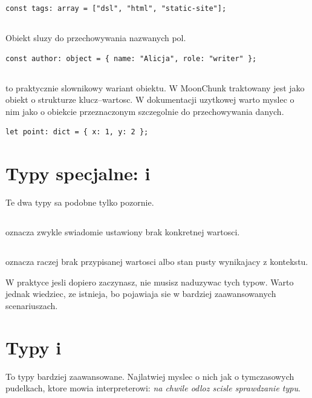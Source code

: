 \begin{lstlisting}[style=moonchunk,caption={Tablica}]
const tags: array = ["dsl", "html", "static-site"];
\end{lstlisting}

\subsection*{}
Obiekt sluzy do przechowywania nazwanych pol.

\begin{lstlisting}[style=moonchunk,caption={Obiekt}]
const author: object = { name: "Alicja", role: "writer" };
\end{lstlisting}

\subsection*{}
 to praktycznie slownikowy wariant obiektu. W MoonChunk traktowany jest jako
obiekt o strukturze klucz--wartosc. W dokumentacji uzytkowej warto myslec o nim jako o
obiekcie przeznaczonym szczegolnie do przechowywania danych.

\begin{lstlisting}[style=moonchunk,caption={Slownik typu dict}]
let point: dict = { x: 1, y: 2 };
\end{lstlisting}

\section{Typy specjalne:  i }
Te dwa typy sa podobne tylko pozornie.

\subsection*{}
 oznacza zwykle swiadomie ustawiony brak konkretnej wartosci.

\subsection*{}
 oznacza raczej brak przypisanej wartosci albo stan pusty wynikajacy
z kontekstu.

W praktyce jesli dopiero zaczynasz, nie musisz naduzywac tych typow. Warto jednak
wiedziec, ze istnieja, bo pojawiaja sie w bardziej zaawansowanych scenariuszach.

\section{Typy  i }
To typy bardziej zaawansowane. Najlatwiej myslec o nich jak o tymczasowych pudelkach,
ktore mowia interpreterowi: \emph{na chwile odloz scisle sprawdzanie typu}.

